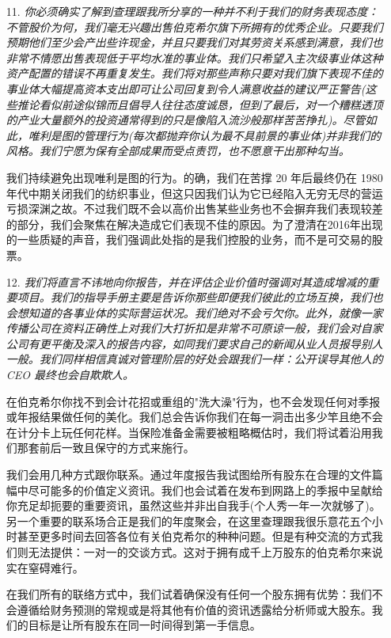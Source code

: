 \documentclass[UTF8,a4paper,zihao=-4,fontset = windows]{ctexart} %
\begin{document}
\begin{itemize}
    \item [11.]
    \textit{你必须确实了解到查理跟我所分享的一种并不利于我们的财务表现态度：不管股价为何，我们毫无兴趣出售伯克希尔旗下所拥有的优秀企业。只要我们预期他们至少会产出些许现金，并且只要我们对其劳资关系感到满意，我们也非常不情愿出售表现低于平均水准的事业体。我们只希望入主次级事业体这种资产配置的错误不再重复发生。我们将对那些声称只要对我们旗下表现不佳的事业体大幅提高资本支出即可让公司回复到令人满意收益的建议严正警告(这些推论看似前途似锦而且倡导人往往态度诚恳，但到了最后，对一个糟糕透顶的产业大量额外的投资通常得到的只是像陷入流沙般那样苦苦挣扎)。尽管如此，唯利是图的管理行为(每次都抛弃你认为最不具前景的事业体)并非我们的风格。我们宁愿为保有全部成果而受点责罚，也不愿意干出那种勾当。}

    我们持续避免出现唯利是图的行为。的确，我们在苦撑 20 年后最终仍在 1980 年代中期关闭我们的纺织事业，但这只因我们认为它已经陷入无穷无尽的营运亏损深渊之故。不过我们既不会以高价出售某些业务也不会摒弃我们表现较差的部分，我们会聚焦在解决造成它们表现不佳的原因。为了澄清在2016年出现的一些质疑的声音，我们强调此处指的是我们控股的业务，而不是可交易的股票。 

    \item [12.]
    \textit{我们将直言不讳地向你报告，并在评估企业价值时强调对其造成增减的重要项目。我们的指导手册主要是告诉你那些即便我们彼此的立场互换，我们也会想知道的各事业体的实际营运状况。我们绝对不会亏欠你。此外，就像一家传播公司在资料正确性上对我们大打折扣是非常不可原谅一般，我们会对自家公司有更平衡及深入的报告内容，如同我们要求自己的新闻从业人员报导别人一般。我们同样相信真诚对管理阶层的好处会跟我们一样：公开误导其他人的 CEO 最终也会自欺欺人。}

    在伯克希尔你找不到会计花招或重组的"洗大澡"行为，也不会发现任何对季报或年报结果做任何的美化。我们总会告诉你我们在每一洞击出多少竿且绝不会在计分卡上玩任何花样。当保险准备金需要被粗略概估时，我们将试着沿用我们那套前后一致且保守的方式来施行。

    我们会用几种方式跟你联系。通过年度报告我试图给所有股东在合理的文件篇幅中尽可能多的价值定义资讯。我们也会试着在发布到网路上的季报中呈献给你充足却扼要的重要资讯，虽然这些并非出自我手(个人秀一年一次就够了)。另一个重要的联系场合正是我们的年度聚会，在这里查理跟我很乐意花五个小时甚至更多时间去回答各位有关伯克希尔的种种问题。但是有种交流的方式我们则无法提供：一对一的交谈方式。这对于拥有成千上万股东的伯克希尔来说实在窒碍难行。
    
    在我们所有的联络方式中，我们试着确保没有任何一个股东拥有优势：我们不会遵循给财务预测的常规或是将其他有价值的资讯透露给分析师或大股东。我们的目标是让所有股东在同一时间得到第一手信息。


\end{itemize}
\end{document}
